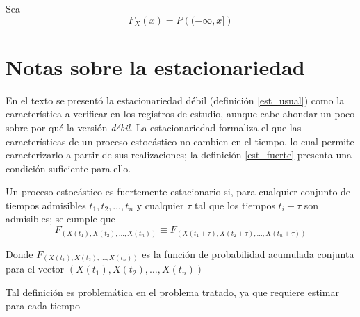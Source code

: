 \begin{defn}
Sea 
\begin{equation*}
F_X (x) = P\left( (-\infty,x] \right)
\end{equation*}
\end{defn}


\section{Notas sobre la estacionariedad}

En el texto se presentó la estacionariedad débil (definición \ref{est_usual}) como la característica
a verificar en los registros de estudio, aunque cabe ahondar un poco sobre por qué
la versión \textit{débil}. La estacionariedad formaliza el que
las características de un proceso estocástico no cambien en el tiempo, lo cual permite 
caracterizarlo a partir de sus realizaciones; la definición \ref{est_fuerte} presenta
una condición suficiente para ello.

\begin{defn}
Un proceso estoc\'astico \xt es fuertemente estacionario si, para cualquier conjunto de 
tiempos admisibles
$t_1,t_2,\dots,t_n$ y cualquier $\tau$ tal que los tiempos $t_i+\tau$ son admisibles; se cumple que
\begin{equation*}
F_{\left(X(t_1),X(t_2),\dots,X(t_n)\right) }
\equiv
F_{\left(X(t_1+\tau),X(t_2+\tau),\dots,X(t_n+\tau)\right)}
\end{equation*}

Donde $F_{\left(X(t_1),X(t_2),\dots,X(t_n)\right) }$ es la funci\'on de probabilidad acumulada 
conjunta para el vector $\left(X(t_1),X(t_2),\dots,X(t_n)\right)$
\label{est_fuerte}
\end{defn}

Tal definición es problemática en el problema tratado, ya que requiere estimar para cada tiempo


